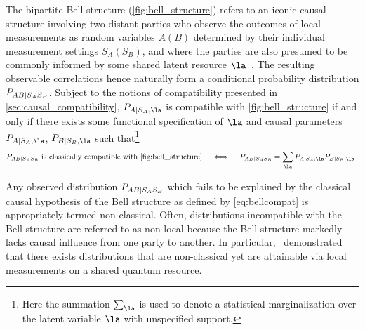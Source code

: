 \documentclass[aps, 10pt, english, twoside, pra, nofootinbib, tightenlines, longbibliography, superscriptaddress]{revtex4-1}
\begin{document}
    The bipartite Bell structure (\cref{fig:bell_structure}) refers to an iconic causal structure involving two distant parties who observe the outcomes of local measurements as random variables $A (B)$ determined by their individual measurement settings $S_A (S_B)$, and where the parties are also presumed to be commonly informed by some shared latent resource $\la$~\cite{Brunner_2013}. The resulting observable correlations hence naturally form a conditional probability distribution $\prob[AB|S_AS_B]$. Subject to the notions of compatibility presented in \cref{sec:causal_compatibility}, $\prob[A|S_A,\la]$ is compatible with \cref{fig:bell_structure} if and only if there exists some functional specification of $\la$ and causal parameters $\prob[A|S_A,\la]$, $\prob[B|S_B,\la]$ such that\footnote{Here the summation $\sum_{\la}$ is used to denote a statistical marginalization over the latent variable $\la$ with unspecified support.}
    \begin{align}\label{eq:bellcompat}
     \prob[AB|S_AS_B] \text{ is classically compatible with \cref{fig:bell_structure}} \quad\iff \quad \prob[AB|S_AS_B] = \sum_{\la} \prob[A|S_A,\la]\prob[B|S_B,\la]\,.
    \end{align}

    Any observed distribution $\prob[AB|S_AS_B]$ which fails to be explained by the classical causal hypothesis of the Bell structure as defined by \cref{eq:bellcompat} is appropriately termed non-classical. Often, distributions incompatible with the Bell structure are referred to as non-local because the Bell structure markedly lacks causal influence from one party to another. In particular,~\citet{Bell_1964} demonstrated that there exists distributions that are non-classical yet are attainable via local measurements on a shared quantum resource.
\end{document}
